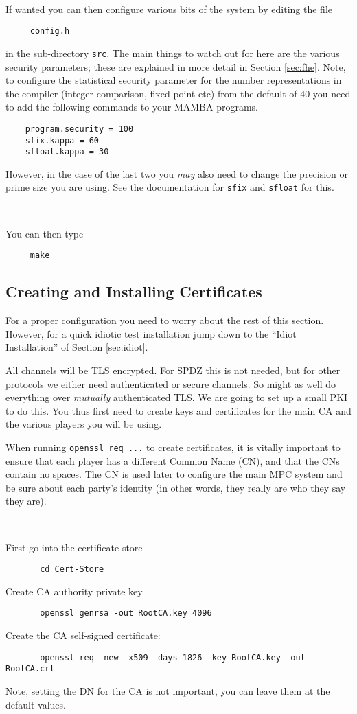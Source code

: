 ~~

\noindent If wanted you can then configure various bits of the system
by editing the file
\begin{verbatim}
     config.h
\end{verbatim}
in the sub-directory \verb+src+.
The main things to watch out for here are the various security parameters;
these are explained in more detail in Section \ref{sec:fhe}.
Note, to configure the statistical security parameter for the number representations
in the compiler (integer comparison, fixed point etc) from the default
of $40$ you need to add the following commands to your MAMBA programs.
\begin{verbatim}
    program.security = 100
    sfix.kappa = 60
    sfloat.kappa = 30
\end{verbatim}
However, in the case of the last two you {\em may} also need to change the
precision or prime size you are using. See the documentation for
\verb+sfix+ and \verb+sfloat+ for this.

~

\noindent You can then type
\begin{verbatim}
     make
\end{verbatim}

\subsection{Creating and Installing Certificates}
For a proper configuration you need to worry about the rest
of this section. 
However, for a quick idiotic test installation jump down to the ``Idiot 
Installation'' of Section \ref{sec:idiot}.

All channels will be TLS encrypted. For SPDZ this is not needed, but for
other protocols we either need authenticated or secure channels. So might
as well do everything over {\em mutually} authenticated TLS. We are going
to set up a small PKI to do this. You thus first need to create
keys and certificates for the main CA and the various players you
will be using.

When running \verb+openssl req ...+ to create certificates, it is
vitally important to ensure that each player has a different Common
Name (CN), and that the CNs contain no spaces.  The CN is used later
to configure the main MPC system and be sure about each party's
identity (in other words, they really are who they say they are).

~~

\noindent
First go into the certificate store
\begin{verbatim}
       cd Cert-Store
\end{verbatim}
Create CA authority private key
\begin{verbatim}
       openssl genrsa -out RootCA.key 4096
\end{verbatim}
Create the CA self-signed certificate:
\begin{verbatim}
       openssl req -new -x509 -days 1826 -key RootCA.key -out RootCA.crt
\end{verbatim}
Note, setting the DN for the CA is not important, you can leave them
at the default values.

